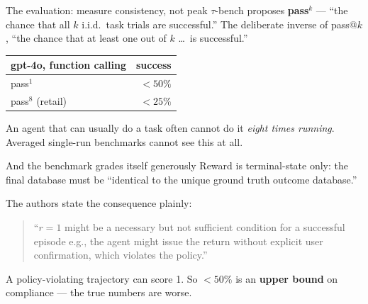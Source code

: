 \documentclass[aspectratio=169]{beamer}
\begin{document}
\begin{frame}{The evaluation: measure consistency, not peak}
  $\tau$-bench \citep{yao2024taubenchbenchmarktoolagentuserinteraction} proposes
  \textbf{pass$^k$} --- ``the chance that all $k$ i.i.d.\ task trials are
  successful.'' The deliberate inverse of pass@$k$, ``the chance that at least
  one out of $k$ \dots\ is successful.''

  \vspace{1em}
  \begin{center}
  \begin{tabular}{lr}
    \toprule
    gpt-4o, function calling & success \\
    \midrule
    pass$^1$ & $< 50\%$ \\
    pass$^8$ (retail) & $< 25\%$ \\
    \bottomrule
  \end{tabular}
  \end{center}

  \vspace{0.8em}
  An agent that can usually do a task often cannot do it \emph{eight times
  running}. Averaged single-run benchmarks cannot see this at all.
\end{frame}

\begin{frame}{And the benchmark grades itself generously}
  Reward is terminal-state only: the final database must be ``identical to the
  unique ground truth outcome database.''

  \vspace{1em}
  The authors state the consequence plainly:

  \begin{quote}
    ``$r = 1$ might be a necessary but not sufficient condition for a successful
    episode e.g., the agent might issue the return without explicit user
    confirmation, which violates the policy.''
  \end{quote}

  \vspace{0.5em}
  A policy-violating trajectory can score 1. So $< 50\%$ is an \textbf{upper
  bound} on compliance --- the true numbers are worse.
\end{frame}
\end{document}
